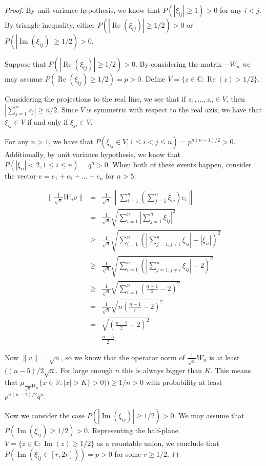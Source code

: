 \documentclass[12pt,a4paper,leqno]{report}
\newcommand{\R}{\mathbb{R}}
\newcommand{\C}{\mathbb{C}}
\renewcommand{\Re}{\operatorname{Re}}
\renewcommand{\Im}{\operatorname{Im}}
\theoremstyle{plain}
\theoremstyle{definition}
\theoremstyle{remark}
\begin{document}
\begin{proof}
By unit variance hypothesis, we know that $P(|\xi_{ij}| \geq 1) > 0$ for any $i<j$.
By triangle inequality, either $P(|\Re(\xi_{ij})| \geq 1/2) > 0$ or $P(|\Im(\xi_{ij})| \geq 1/2) > 0$.

Suppose that $P(|\Re(\xi_{ij})| \geq 1/2) > 0$.
By considering the matrix $-W_n$ we may assume $P(\Re(\xi_{ij}) \geq 1/2) = p > 0$. Define $V=\{z \in \C : \Re(z)> 1/2\}$.

Considering the projections to the real line, we see that if $z_1,\ldots,z_n \in V$, then $|\sum_{j=1}^{n}z_j| \geq n/2$. Since $V$ is symmetric with respect to the real axis, we have that $\xi_{ij} \in V$ if and only if $\xi_{ji} \in V$.

For any $n>1$, we have that $P(\xi_{ij} \in V, 1 \leq i<j\leq n) = p^{n(n-1)/2} > 0$. Additionally, by unit variance hypothesis, we know that $P(|\xi_{ii}|<2, 1\leq i \leq n) = q^n > 0$. When both of these events happen, consider the vector $ v =e_1+e_2+\ldots + e_n$ for $n > 5$:

\begin{eqnarray*}
\|\frac{1}{\sqrt{n}}W_nv\| & = & \frac{1}{\sqrt{n}} \left\| \sum_{i=1}^n (\sum_{j=1}^n\xi_{ij})e_i \right\|  \\
& = & \frac{1}{\sqrt{n}} \sqrt{\sum_{i=1}^n |\sum_{j=1}^n\xi_{ij}|^2}\\
& \geq & \frac{1}{\sqrt{n}} \sqrt{\sum_{i=1}^n \left(|\sum_{j=1, j\neq i}^n \xi_{ij}|-|\xi_{ii}|\right)^2}\\
& \geq & \frac{1}{\sqrt{n}} \sqrt{\sum_{i=1}^n \left(|\sum_{j=1, j\neq i}^n \xi_{ij}|-2\right)^2}\\
& \geq &  \frac{1}{\sqrt{n}} \sqrt{\sum_{i=1}^n \left(\frac{n-1}{2}-2\right)^2}\\
& = & \frac{1}{\sqrt{n}} \sqrt{n \left(\frac{n-1}{r}-2\right)^2}\\
& = & \sqrt{\left(\frac{n-1}{2}-2\right)^2}\\
& = & \frac{n-5}{2}.
\end{eqnarray*}

Now $\|v\| = \sqrt{n}$, so we know that the operator norm of $\frac{1}{\sqrt{n}} W_n$ is at least $((n-5)/2\sqrt{n}$. For large enough $n$ this is always bigger than $K$. This means that $\mu_{\frac{1}{\sqrt{n}}W_n} \{x \in \R : |x|>K\} > 0)) \geq 1/n > 0$ with probability at least $p^{n(n-1)/2}q^n$.


Now we consider the case $P(|\Im(\xi_{ij})| \geq 1/2) > 0$. We may assume that $P(\Im(\xi_{ij}) \geq 1/2) > 0$. Representing the half-plane $V = \{ z \in \C : \Im(z) \geq 1/2\}$ as a countable union, we conclude that $P(\Im(\xi_{ij} \in [r,2r])) = p > 0$ for some $r\geq 1/2$.


\end{proof}
\end{document}
